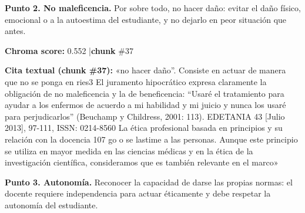 \documentclass[11pt]{article}
\newcommand{\score}[2]{{\small\textbf{Chroma score:} #1 \quad|\quad \textbf{chunk} \##2}}
\begin{document}
\par
\vspace{0.9em}
\noindent\textbf{Punto 2. No maleficencia.} Por sobre todo, no hacer da\~no: evitar el da\~no f\'isico, emocional o a la autoestima del estudiante, y no dejarlo en peor situaci\'on que antes.\par
\score{0.552}{37}\par\smallskip
{}\par\smallskip
\begin{mdframed}[backgroundcolor=qbg,linecolor=qrule,linewidth=1pt,leftline=true,topline=false,bottomline=false,rightline=false,innerleftmargin=8pt,innertopmargin=6pt,innerbottommargin=6pt]
{\small\textbf{Cita textual (chunk \#37):} «no hacer daño''. Consiste en actuar de manera que no se ponga en ries3 El juramento hipocrático expresa claramente la obligación de no maleficencia y la de beneficencia: ``Usaré el tratamiento para ayudar a los enfermos de acuerdo a mi habilidad y mi juicio y nunca los usaré para perjudicarlos'' (Beuchamp y Childress, 2001: 113). EDETANIA 43 [Julio 2013], 97-111, ISSN: 0214-8560 La ética profesional basada en principios y su relación con la docencia 107 go o se lastime a las personas. Aunque este principio se utiliza en mayor medida en las ciencias médicas y en la ética de la investigación científica, consideramos que es también relevante en el marco»}
\end{mdframed}
\par
\vspace{0.9em}
\noindent\textbf{Punto 3. Autonom\'ia.} Reconocer la capacidad de darse las propias normas: el docente requiere independencia para actuar \'eticamente y debe respetar la autonom\'ia del estudiante.\par
\end{document}
